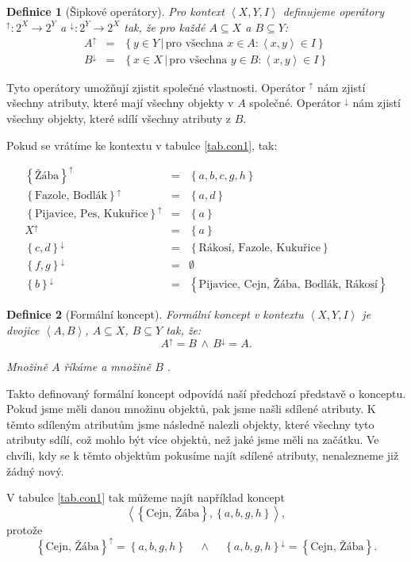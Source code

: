 \documentclass[12pt]{article}
\newcommand{\sep}{\,|\,}
\newcommand{\foreach}{\mbox{pro všechna }}
\newcommand{\adds}[1]{\left\{#1\right\}}
\newcommand{\addsp}[1]{\left<#1\right>}
\newcommand{\logand}{\,\wedge\,}
\newcommand{\context}{\addsp{X, Y, I}}
\newcommand{\AB}{\addsp{A, B}}
\newcommand{\up}{^{\uparrow}}
\newcommand{\down}{^{\downarrow}}
\newtheorem{mydef}{Definice}
\begin{document}
\begin{mydef}[Šipkové operátory]
Pro kontext $\context$ definujeme operátory $\up:2^X\rightarrow2^Y$ a $\down:2^Y\rightarrow2^X$ tak, že pro každé $A\subseteq X$ a $B\subseteq Y$:
\begin{eqnarray}
A\up&=&\adds{y\in Y\sep \foreach x \in A: \addsp{x, y}\in I}\\
B\down&=&\adds{x\in X\sep\foreach y\in B:\addsp{x, y} \in I}
\end{eqnarray}
\end{mydef}

Tyto operátory umožňují zjistit společné vlastnosti. Operátor $\up$ nám zjistí všechny atributy, které mají všechny objekty v $A$ společné. Operátor $\down$ nám zjistí všechny objekty, které sdílí všechny atributy z $B$. 

Pokud se vrátíme ke kontextu v tabulce \ref{tab.con1}, tak:

\begin{eqnarray*}
\adds{\mbox{Žába}}\up&=&\adds{a, b, c, g, h}\\
\adds{\mbox{Fazole, Bodlák}}\up&=&\adds{a, d}\\
\adds{\mbox{Pijavice, Pes, Kukuřice}}\up&=&\adds{a}\\
X\up&=&\adds{a}\\
\adds{c, d}\down&=&\adds{\mbox{Rákosí, Fazole, Kukuřice}}\\
\adds{f, g}\down&=&\emptyset\\
\adds{b}\down&=&\adds{\mbox{Pijavice, Cejn, Žába, Bodlák, Rákosí}}
\end{eqnarray*}


\begin{mydef}[Formální koncept]
Formální koncept v kontextu $\context$ je dvojice $\AB$, $A\subseteq X$, $B\subseteq Y$ tak, že:
$$A\up=B\logand B\down =A.$$

Množině $A$ říkáme  a množině $B$ .
\end{mydef}

Takto definovaný formální koncept odpovídá naší předchozí představě o konceptu. Pokud jsme měli danou množinu objektů, pak jsme našli sdílené atributy. K těmto sdíleným atributům jsme následně nalezli objekty, které všechny tyto atributy sdílí, což mohlo být více objektů, než jaké jsme měli na začátku. Ve chvíli, kdy se k těmto objektům pokusíme najít sdílené atributy, nenalezneme již žádný nový.

V tabulce \ref{tab.con1} tak můžeme najít například koncept 
$$\addsp{\adds{\mbox{Cejn, Žába}}, \adds{a, b, g, h}},$$ 
protože 
$$\adds{\mbox{Cejn, Žába}}\up=\adds{a, b, g, h}\quad \logand \quad \adds{a, b, g, h}\down=\adds{\mbox{Cejn, Žába}}.$$
\end{document}

